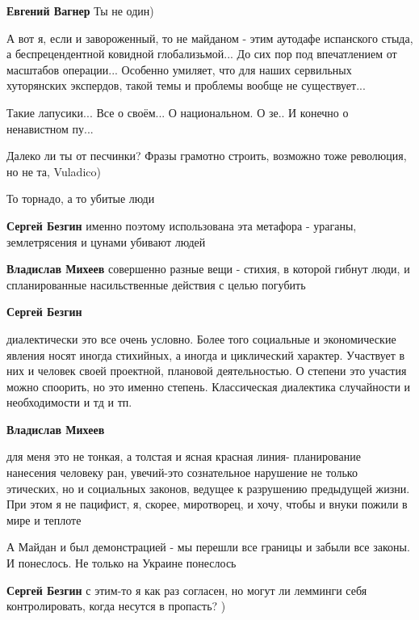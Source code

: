 \begin{itemize}
\begin{itemize}
\textbf{Евгений Вагнер} Ты не один)
\end{itemize} %


А вот я, если и завороженный, то не майданом - этим аутодафе испанского стыда,
а беспрецендентной ковидной глобализьмой... До сих пор под впечатлением от
масштабов операции... Особенно умиляет, что для наших сервильных хуторянских
экспердов, такой темы и проблемы вообще не существует...

Такие лапусики... Все о своём... О национальном. О зе.. И конечно о ненавистном
пу...

Далеко ли ты от песчинки? Фразы грамотно строить, возможно тоже революция, но не та, Vuladico)

То торнадо, а то убитые люди

\begin{itemize} %
\textbf{Сергей Безгин} именно поэтому использована эта метафора - ураганы, землетрясения и цунами убивают людей

\textbf{Владислав Михеев} совершенно разные вещи - стихия, в которой гибнут люди, и спланированные насильственные действия с целью погубить

\textbf{Сергей Безгин} 

диалектически это все очень условно. Более того социальные и экономические
явления носят иногда стихийных, а иногда и циклический характер. Участвует в
них и человек своей проектной, плановой деятельностью. О степени это участия
можно споорить, но это именно степень. Классическая диалектика случайности и
необходимости и тд и тп.

\textbf{Владислав Михеев} 

для меня это не тонкая, а толстая и ясная красная линия- планирование нанесения
человеку ран, увечий-это сознательное нарушение не только этических, но и
социальных законов, ведущее к разрушению предыдущей жизни. При этом я не
пацифист, я, скорее, миротворец, и хочу, чтобы и внуки пожили в мире и теплоте


А Майдан и был демонстрацией - мы перешли все границы и забыли все законы. И
понеслось. Не только на Украине понеслось

\textbf{Сергей Безгин} с этим-то я как раз согласен, но могут ли лемминги себя контролировать, когда несутся в пропасть? )


\end{itemize}
\end{itemize}
